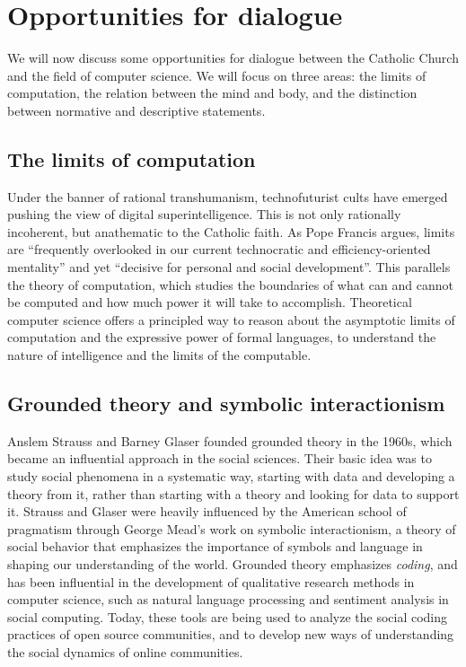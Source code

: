 \documentclass[sigplan,nonacm]{acmart}\settopmatter{printfolios=false,printccs=false,printacmref=false}
\begin{document}
  \section{Opportunities for dialogue}

  We will now discuss some opportunities for dialogue between the Catholic Church and the field of computer science. We will focus on three areas: the limits of computation, the relation between the mind and body, and the distinction between normative and descriptive statements.

  \subsection{The limits of computation}

  Under the banner of rational transhumanism, technofuturist cults have emerged pushing the view of digital superintelligence. This is not only rationally incoherent, but anathematic to the Catholic faith. As Pope Francis argues, limits are ``frequently overlooked in our current technocratic and efficiency-oriented mentality'' and yet ``decisive for personal and social development''. This parallels the theory of computation, which studies the boundaries of what can and cannot be computed and how much power it will take to accomplish. Theoretical computer science offers a principled way to reason about the asymptotic limits of computation and the expressive power of formal languages, to understand the nature of intelligence and the limits of the computable.


  \subsection{Grounded theory and symbolic interactionism}

  Anslem Strauss and Barney Glaser founded grounded theory in the 1960s, which became an influential approach in the social sciences. Their basic idea was to study social phenomena in a systematic way, starting with data and developing a theory from it, rather than starting with a theory and looking for data to support it. Strauss and Glaser were heavily influenced by the American school of pragmatism through George Mead's work on symbolic interactionism, a theory of social behavior that emphasizes the importance of symbols and language in shaping our understanding of the world. Grounded theory emphasizes \textit{coding}, and has been influential in the development of qualitative research methods in computer science, such as natural language processing and sentiment analysis in social computing. Today, these tools are being used to analyze the social coding practices of open source communities, and to develop new ways of understanding the social dynamics of online communities.
\end{document}
